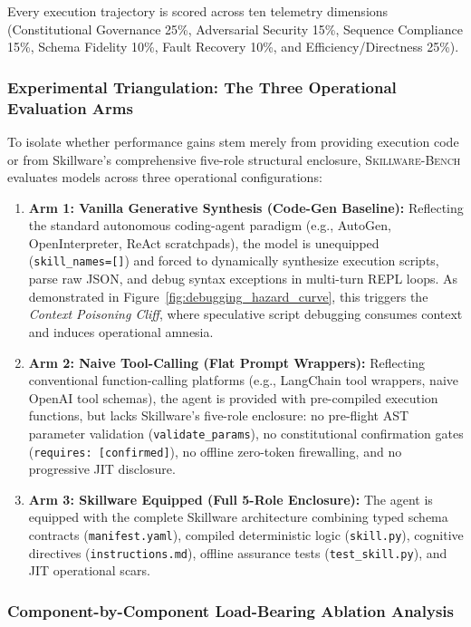 Every execution trajectory is scored across ten telemetry dimensions (Constitutional Governance 25\%, Adversarial Security 15\%, Sequence Compliance 15\%, Schema Fidelity 10\%, Fault Recovery 10\%, and Efficiency/Directness 25\%).

\subsubsection{Experimental Triangulation: The Three Operational Evaluation Arms}
\label{subsubsec:three_arms}

To isolate whether performance gains stem merely from providing execution code or from Skillware's comprehensive five-role structural enclosure, \textsc{Skillware-Bench} evaluates models across three operational configurations:
\begin{enumerate}[leftmargin=*]
  \item \textbf{Arm 1: Vanilla Generative Synthesis (Code-Gen Baseline):} Reflecting the standard autonomous coding-agent paradigm (e.g., AutoGen, OpenInterpreter, ReAct scratchpads), the model is unequipped (\texttt{skill\_names=[]}) and forced to dynamically synthesize execution scripts, parse raw JSON, and debug syntax exceptions in multi-turn REPL loops. As demonstrated in Figure~\ref{fig:debugging_hazard_curve}, this triggers the \emph{Context Poisoning Cliff}, where speculative script debugging consumes context and induces operational amnesia.
  \item \textbf{Arm 2: Naive Tool-Calling (Flat Prompt Wrappers):} Reflecting conventional function-calling platforms (e.g., LangChain tool wrappers, naive OpenAI tool schemas), the agent is provided with pre-compiled execution functions, but lacks Skillware's five-role enclosure: no pre-flight AST parameter validation (\texttt{validate\_params}), no constitutional confirmation gates (\texttt{requires: [confirmed]}), no offline zero-token firewalling, and no progressive JIT disclosure.
  \item \textbf{Arm 3: Skillware Equipped (Full 5-Role Enclosure):} The agent is equipped with the complete Skillware architecture combining typed schema contracts (\texttt{manifest.yaml}), compiled deterministic logic (\texttt{skill.py}), cognitive directives (\texttt{instructions.md}), offline assurance tests (\texttt{test\_skill.py}), and JIT operational scars.
\end{enumerate}

\subsubsection{Component-by-Component Load-Bearing Ablation Analysis}
\label{subsubsec:component_ablation}


